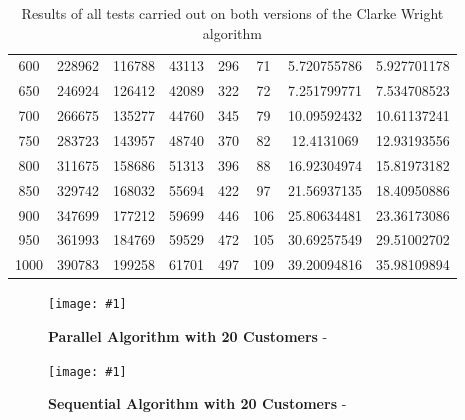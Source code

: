 \documentclass[conference]{acmsiggraph}
\newcommand{\figuremacroW}[4]{
	\begin{figure}[h] %
		\centering
		\texttt{[image: \#1]}
		\caption[#2]{\textbf{#2} - #3}
		\label{fig:#1}
	\end{figure}
}
\begin{document}
\begin{table}[b]
{{\begin{minipage}{\textwidth}
\begin{tabular}{cccccccc}
    600                  & 228962             & 116788          & 43113         & 296               & 71              & 5.720755786               & 5.927701178             \\
    650                  & 246924             & 126412          & 42089         & 322               & 72              & 7.251799771               & 7.534708523             \\
    700                  & 266675             & 135277          & 44760         & 345               & 79              & 10.09592432               & 10.61137241             \\
    750                  & 283723             & 143957          & 48740         & 370               & 82              & 12.4131069                & 12.93193556             \\
    800                  & 311675             & 158686          & 51313         & 396               & 88              & 16.92304974               & 15.81973182             \\
    850                  & 329742             & 168032          & 55694         & 422               & 97              & 21.56937135               & 18.40950886             \\
    900                  & 347699             & 177212          & 59699         & 446               & 106             & 25.80634481               & 23.36173086             \\
    950                  & 361993             & 184769          & 59529         & 472               & 105             & 30.69257549               & 29.51002702             \\
    1000                 & 390783             & 199258          & 61701         & 497               & 109             & 39.20094816               & 35.98109894             \\\hline
    \end{tabular}
   
    \caption[Table caption text]{Results of all tests carried out on both versions of the Clarke Wright algorithm}
    \label{table:name}
    \end{minipage} }
}
\end{table}

\clearpage

\figuremacroW
{rand00020cwpsn}
{Parallel Algorithm with 20 Customers}
{}
{0.76}

\figuremacroW
{rand00020cwsn}
{Sequential Algorithm with 20 Customers}
{}
{0.76}
\end{document}

